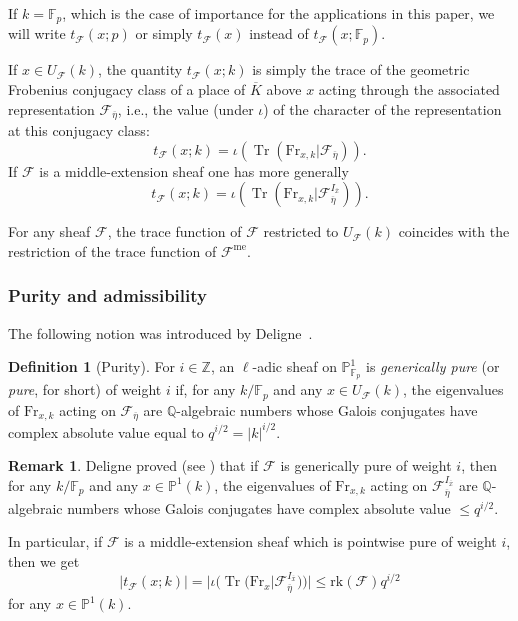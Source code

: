\documentclass[12pt,a4paper,reqno]{amsart}
\numberwithin{equation}{section}
\theoremstyle{plain}
\theoremstyle{definition}
\newtheorem{definition}[theorem]{Definition}
\newtheorem{remark}[theorem]{Remark}
\newcommand\F{\mathbb{F}}
\newcommand\Z{\mathbb{Z}}
\newcommand\Q{\mathbb{Q}}
\newcommand\rk{\mathrm{rk}}
\newcommand\Fr{\mathrm{Fr}}
\newcommand\ov{\overline}
\newcommand\mcF{\mathcal{F}}
\newcommand\Pl{\mathbb{P}^1}
\DeclareMathOperator{\Tr}{Tr}
\newcommand\Fp{\F_{p}}
\begin{document}
If $k=\Fp$, which is the case of importance for the applications in
this paper, we will write $t_{\mcF}(x;p)$ or simply $t_{\mcF}(x)$
instead of $t_{\mcF}(x;\Fp)$.

If $x\in U_\mcF(k)$, the quantity $t_\mcF(x;k)$ is simply the trace of
the geometric Frobenius conjugacy class of a place of $\ov K$ above
$x$ acting through the associated representation $\mcF_{\ov\eta}$,
i.e., the value (under $\iota$) of the character of the
representation at this conjugacy class:
$$
t_{\mcF}(x;k)=\iota(\Tr(\Fr_{x,k}|\mcF_{\ov\eta})).
$$
If $\mcF$ is a middle-extension sheaf one has more generally
$$
t_{\mcF}(x;k)=\iota(\Tr(\Fr_{x,k}|\mcF_{\ov\eta}^{I_{\ov x}})).
$$

For any sheaf $\mcF$, the trace function of $\mcF$ restricted to
$U_\mcF(k)$ coincides with the restriction of the trace function of
$\mcF^{\mathrm{me}}$.

\subsubsection{Purity and admissibility}

The following notion was introduced by Deligne~\cite{WeilII}.

\begin{definition}[Purity] For $i\in \Z$, an $\ell$-adic sheaf on
  $\Pl_{\Fp}$ is \emph{generically pure} (or \emph{pure}, for short) of
  weight $i$ if, for any $k/\Fp$ and any $x\in U_\mcF(k)$, the
  eigenvalues of $\Fr_{x,k}$ acting on $\mcF_{\ov\eta}$ are $\Q$-algebraic
  numbers whose Galois conjugates have complex absolute value equal to
  $q^{i/2}=|k|^{i/2}$.
\end{definition}

\begin{remark} Deligne proved (see \cite[(1.8.9)]{WeilII}) that if
  $\mcF$ is generically pure of weight $i$, then for any $k/\Fp$ and
  any $x\in \Pl(k)$, the eigenvalues of $\Fr_{x,k}$ acting on
  $\mcF_{\ov\eta}^{I_{\ov x}}$ are $\Q$-algebraic numbers whose Galois
  conjugates have complex absolute value $\leq q^{i/2}$.

In particular, if $\mcF$ is a middle-extension sheaf which is pointwise pure
of weight $i$, then we get
\begin{equation}\label{traceupperbound}
  |t_\mcF(x;k)|=|\iota(\Tr(\Fr_x|\mcF_{\ov\eta}^{I_{\ov x}}))|\leq \rk(\mcF)q^{i/2}
\end{equation}
for any $x\in\Pl(k)$.
\end{remark}
\end{document}
